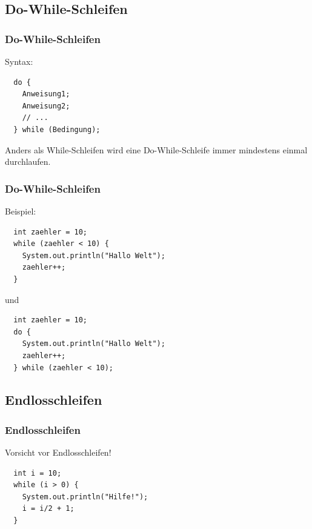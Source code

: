 \documentclass[final]{beamer}
\begin{document}
\subsection{Do-While-Schleifen}
\begin{frame}[containsverbatim]
  \frametitle{Do-While-Schleifen}
  Syntax:
  \begin{lstlisting}
  do {
	Anweisung1;
	Anweisung2;
	// ...
  } while (Bedingung);
  \end{lstlisting}
  Anders als While-Schleifen wird eine Do-While-Schleife immer mindestens einmal durchlaufen.
\end{frame}
\begin{frame}[containsverbatim]
  \frametitle{Do-While-Schleifen}
  Beispiel:
  \begin{lstlisting}
  int zaehler = 10;
  while (zaehler < 10) {
	System.out.println("Hallo Welt");
	zaehler++;
  }
  \end{lstlisting}
  und
  \begin{lstlisting}
  int zaehler = 10;
  do {
	System.out.println("Hallo Welt");
	zaehler++;
  } while (zaehler < 10);
  \end{lstlisting}
\end{frame}

\subsection{Endlosschleifen}
\begin{frame}[containsverbatim]
  \frametitle{Endlosschleifen}
  Vorsicht vor Endlosschleifen!
  \begin{lstlisting}
  int i = 10;
  while (i > 0) {
	System.out.println("Hilfe!");
	i = i/2 + 1;
  }
  \end{lstlisting}
\end{frame}
\end{document}
